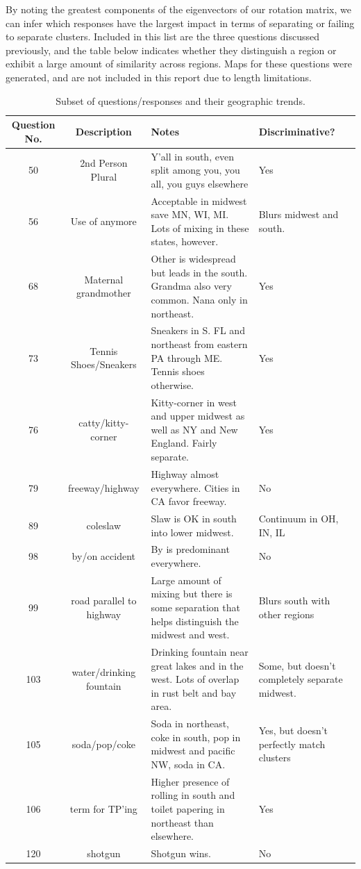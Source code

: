 \documentclass[english]{article}\usepackage{graphicx, color}
\numberwithin{equation}{section}
\numberwithin{figure}{section}
\begin{document}
By noting the greatest components of the eigenvectors of our rotation matrix, we can infer which responses have the largest impact in terms of separating or failing to separate clusters. Included in this list are the three questions discussed previously, and the table below indicates whether they distinguish a region or exhibit a large amount of similarity across regions. Maps for these questions were generated, and are not included in this report due to length limitations. 

\begin{table}
\caption{Subset of questions/responses and their geographic trends.}
\begin{center}
  \begin{tabular}{| c | c | p{5cm}  | p{3cm} |}
    \hline
    Question No. & Description & Notes & Discriminative? \\ \hline
    50 & 2nd Person Plural & Y'all in south, even split among you, you all, you guys elsewhere & Yes \\ \hline
    56 & Use of anymore & Acceptable in midwest save MN, WI, MI. Lots of mixing in these states, however. & Blurs midwest and south.  \\ \hline
    68 & Maternal grandmother & Other is widespread but leads in the south. Grandma also very common. Nana only in northeast. & Yes \\ \hline
    73 & Tennis Shoes/Sneakers & Sneakers in S. FL and northeast from eastern PA through ME. Tennis shoes otherwise. & Yes\\ \hline
    76 & catty/kitty-corner & Kitty-corner in west and upper midwest as well as NY and New England. Fairly separate. & Yes\\ \hline
    79 & freeway/highway & Highway almost everywhere. Cities in CA favor freeway. & No\\ \hline
    89 & coleslaw & Slaw is OK in south into lower midwest. & Continuum in OH, IN, IL \\ \hline
    98 & by/on accident & By is predominant everywhere. & No \\ \hline
    99 & road parallel to highway & Large amount of mixing but there is some separation that helps distinguish the midwest and west. & Blurs south with other regions \\ \hline
    103 & water/drinking fountain & Drinking fountain near great lakes and in the west. Lots of overlap in rust belt and bay area. & Some, but doesn't completely separate midwest. \\ \hline
    105 & soda/pop/coke & Soda in northeast, coke in south, pop in midwest and pacific NW, soda in CA. & Yes, but doesn't perfectly match clusters \\ \hline
    106 & term for TP'ing & Higher presence of rolling in south and toilet papering in northeast than elsewhere. & Yes \\ \hline
    120 & shotgun & Shotgun wins. & No \\ \hline
  \end{tabular}
\end{center}
\end{table}
\end{document}
